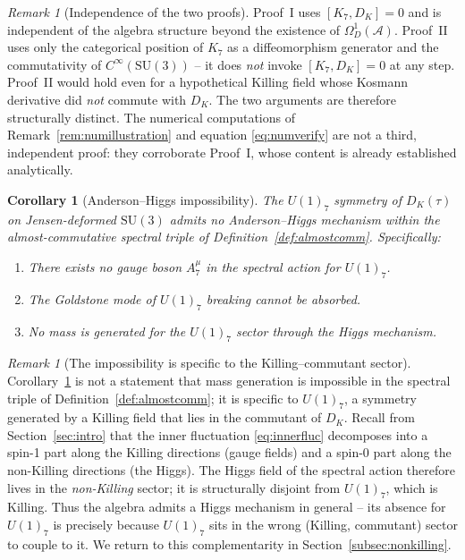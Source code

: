 \documentclass[12pt]{article}
\newtheorem{corollary}[theorem]{Corollary}
\theoremstyle{definition}
\theoremstyle{remark}
\newtheorem{remark}[theorem]{Remark}
\newcommand{\Alg}{\mathcal{A}}
\begin{document}
\begin{remark}[Independence of the two proofs]
Proof~I uses $[K_7, D_K] = 0$ and is independent of the algebra structure beyond the existence of $\Omega^1_D(\Alg)$.  Proof~II uses only the categorical position of $K_7$ as a diffeomorphism generator and the commutativity of $C^\infty(\mathrm{SU}(3))$ -- it does \emph{not} invoke $[K_7, D_K] = 0$ at any step.  Proof~II would hold even for a hypothetical Killing field whose Kosmann derivative did \emph{not} commute with $D_K$.  The two arguments are therefore structurally distinct.  The numerical computations of Remark~\ref{rem:numillustration} and equation \eqref{eq:numverify} are not a third, independent proof: they corroborate Proof~I, whose content is already established analytically.
\end{remark}

\begin{corollary}[Anderson--Higgs impossibility]\label{cor:noanderson}
The $U(1)_7$ symmetry of $D_K(\tau)$ on Jensen-deformed $\mathrm{SU}(3)$ admits no Anderson--Higgs mechanism within the almost-commutative spectral triple of Definition~\ref{def:almostcomm}.  Specifically:
\begin{enumerate}
  \item There exists no gauge boson $A_7^\mu$ in the spectral action for $U(1)_7$.
  \item The Goldstone mode of $U(1)_7$ breaking cannot be absorbed.
  \item No mass is generated for the $U(1)_7$ sector through the Higgs mechanism.
\end{enumerate}
\end{corollary}

\begin{remark}[The impossibility is specific to the Killing--commutant sector]\label{rem:notgeneral}
Corollary~\ref{cor:noanderson} is not a statement that mass generation is impossible in the spectral triple of Definition~\ref{def:almostcomm}; it is specific to $U(1)_7$, a symmetry generated by a Killing field that lies in the commutant of $D_K$.  Recall from Section~\ref{sec:intro} that the inner fluctuation \eqref{eq:innerfluc} decomposes into a spin-1 part along the Killing directions (gauge fields) and a spin-0 part along the non-Killing directions (the Higgs).  The Higgs field of the spectral action therefore lives in the \emph{non-Killing} sector; it is structurally disjoint from $U(1)_7$, which is Killing.  Thus the algebra admits a Higgs mechanism in general -- its absence for $U(1)_7$ is precisely because $U(1)_7$ sits in the wrong (Killing, commutant) sector to couple to it.  We return to this complementarity in Section~\ref{subsec:nonkilling}.
\end{remark}
\end{document}
